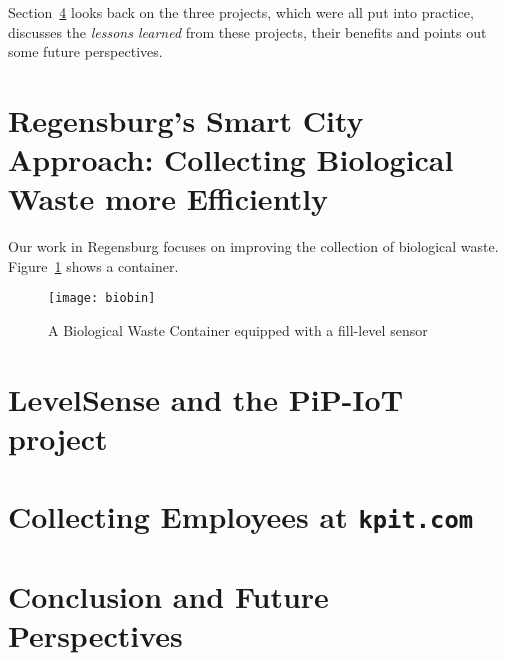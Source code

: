 \documentclass[10pt]{article}
\begin{document}
Section~\ref{sec:concl} looks back on the three projects, which were all 
put into practice, discusses the {\it lessons learned} from these projects,
their benefits and points out some future perspectives.


\section{Regensburg's Smart City Approach: Collecting Biological Waste more Efficiently}
\label{sec:Regensburg}

Our work in Regensburg focuses on improving the collection of biological waste.
Figure~\ref{fig:container} shows a container.

\begin{figure}[h!]
    \centering
	\texttt{[image: biobin]}
	\caption{A Biological Waste Container equipped with a fill-level sensor}
	\label{fig:container}       %
\end{figure}

\blindtext

\section{LevelSense and the PiP-IoT project}
\label{sec:Christchurch}

\blindtext

\section{Collecting Employees at {\tt kpit.com}}
\label{sec:Pune}

\blindtext

\section{Conclusion and Future Perspectives}
\label{sec:concl}

\blindtext






\end{document}

